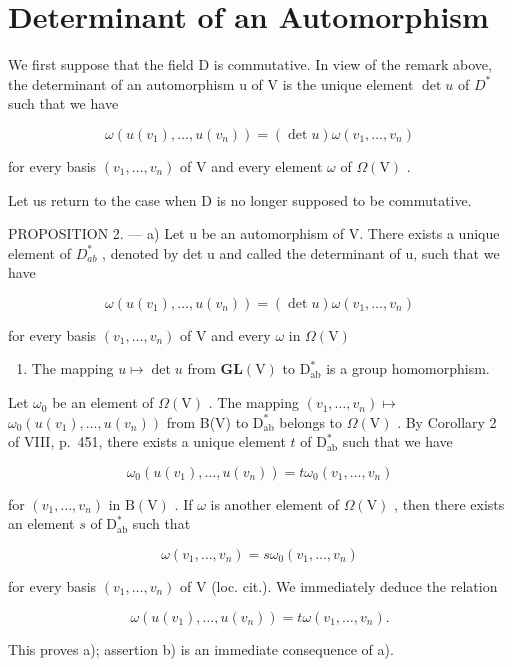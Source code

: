 \section{Determinant of an Automorphism}

We first suppose that the field D is commutative. In view of the remark above, the determinant of an automorphism u of V is the unique element \(\det u\) of \(D^{*}\) such that we have

\[
\omega (u (v _ {1}), \ldots , u (v _ {n})) = (\det u) \omega (v _ {1}, \ldots , v _ {n})\tag{14}
\]

for every basis \((v_{1},\ldots ,v_{n})\) of V and every element \(\omega\) of \(\Omega (\mathrm{V})\) .

Let us return to the case when D is no longer supposed to be commutative.

PROPOSITION 2. --- a) Let u be an automorphism of V. There exists a unique element of \(D_{ab}^{*}\) , denoted by det u and called the determinant of u, such that we have

\[
\omega (u (v _ {1}), \ldots , u (v _ {n})) = (\det u) \omega (v _ {1}, \ldots , v _ {n})\tag{15}
\]

for every basis \((v_{1},\ldots ,v_{n})\) of V and every \(\omega\) in \(\Omega (\mathrm{V})\)

\begin{enumerate}
\def\labelenumi{\alph{enumi})}
\setcounter{enumi}{1}
\tightlist
\item
  The mapping \(u \mapsto \det u\) from \(\mathbf{GL}(\mathrm{V})\) to \(\mathrm{D}_{\mathrm{ab}}^{*}\) is a group homomorphism.
\end{enumerate}

Let \(\omega_0\) be an element of \(\Omega (\mathrm{V})\) . The mapping \((v_{1},\ldots ,v_{n})\mapsto\) \(\omega_0(u(v_1),\dots ,u(v_n))\) from B(V) to \(\mathrm{D}_{\mathrm{ab}}^{*}\) belongs to \(\Omega (\mathrm{V})\) . By Corollary 2 of VIII, p.~451, there exists a unique element \(t\) of \(\mathrm{D}_{\mathrm{ab}}^{*}\) such that we have

\[
\omega_ {0} (u (v _ {1}), \ldots , u (v _ {n})) = t \omega_ {0} (v _ {1}, \ldots , v _ {n})
\]

for \((v_{1},\ldots ,v_{n})\) in \(\mathrm{B(V)}\) . If \(\omega\) is another element of \(\Omega (\mathrm{V})\) , then there exists an element \(s\) of \(\mathrm{D}_{\mathrm{ab}}^{*}\) such that

\[
\omega (v _ {1}, \ldots , v _ {n}) = s \omega_ {0} (v _ {1}, \ldots , v _ {n})
\]

for every basis \((v_{1},\ldots ,v_{n})\) of V (loc. cit.). We immediately deduce the relation

\[
\omega (u (v _ {1}), \dots , u (v _ {n})) = t \omega (v _ {1}, \dots , v _ {n}).
\]

This proves a); assertion b) is an immediate consequence of a).

